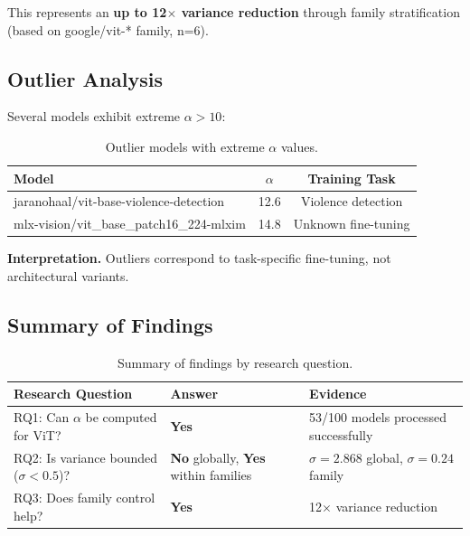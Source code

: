 This represents an \textbf{up to 12$\times$ variance reduction} through family stratification (based on google/vit-* family, n=6).

\subsection{Outlier Analysis}

Several models exhibit extreme $\alpha > 10$:

\begin{table}[h]
\centering
\begin{tabular}{@{}lcc@{}}
\toprule
Model & $\alpha$ & Training Task \\
\midrule
jaranohaal/vit-base-violence-detection & 12.6 & Violence detection \\
mlx-vision/vit\_base\_patch16\_224-mlxim & 14.8 & Unknown fine-tuning \\
\bottomrule
\end{tabular}
\caption{Outlier models with extreme $\alpha$ values.}
\label{tab:outliers}
\end{table}

\textbf{Interpretation.} Outliers correspond to task-specific fine-tuning, not architectural variants.

\subsection{Summary of Findings}

\begin{table}[h]
\centering
\begin{tabular}{@{}p{4cm}p{3cm}p{4cm}@{}}
\toprule
Research Question & Answer & Evidence \\
\midrule
RQ1: Can $\alpha$ be computed for ViT? & \textbf{Yes} & 53/100 models processed successfully \\
RQ2: Is variance bounded ($\sigma < 0.5$)? & \textbf{No} globally, \textbf{Yes} within families & $\sigma = 2.868$ global, $\sigma = 0.24$ family \\
RQ3: Does family control help? & \textbf{Yes} & 12$\times$ variance reduction \\
\bottomrule
\end{tabular}
\caption{Summary of findings by research question.}
\label{tab:summary}
\end{table}
